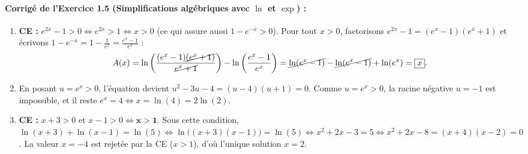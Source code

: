 \paragraph{Corrigé de l'Exercice 1.5 (Simplifications algébriques avec $\ln$ et $\exp$) :}
\begin{enumerate}[label=(\alph*)]
    \item \textbf{CE :} $e^{2x} - 1 > 0 \iff e^{2x} > 1 \iff x > 0$ (ce qui assure aussi $1 - e^{-x} > 0$). Pour tout $x > 0$, factorisons $e^{2x} - 1 = (e^x - 1)(e^x + 1)$ et écrivons $1 - e^{-x} = 1 - \frac{1}{e^x} = \frac{e^x - 1}{e^x}$ :
    \[
        A(x) = \ln\left(\frac{(e^x-1)\cancel{(e^x+1)}}{\cancel{e^x+1}}\right) - \ln\left(\frac{e^x - 1}{e^x}\right) = \cancel{\ln(e^x - 1)} - \cancel{\ln(e^x - 1)} + \ln(e^x) = \boxed{x}.
    \]
    \item En posant $u = e^x > 0$, l'équation devient $u^2 - 3u - 4 = (u - 4)(u + 1) = 0$. Comme $u = e^x > 0$, la racine négative $u = -1$ est impossible, et il reste $e^x = 4 \iff \boxed{x = \ln(4) = 2\ln(2)}$.
    \item \textbf{CE :} $x + 3 > 0$ et $x - 1 > 0 \iff \mathbf{x > 1}$. Sous cette condition, $\ln(x+3) + \ln(x-1) = \ln(5) \iff \ln\bigl((x+3)(x-1)\bigr) = \ln(5) \iff x^2 + 2x - 3 = 5 \iff x^2 + 2x - 8 = (x+4)(x-2) = 0$. La valeur $x = -4$ est rejetée par la CE ($x > 1$), d'où l'unique solution $\boxed{x = 2}$.
\end{enumerate}

